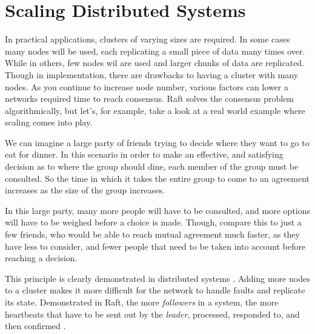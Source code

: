 \section{Scaling Distributed Systems}

In practical applications, clusters of varying sizes are required. In some cases many nodes will be used, each replicating a small piece of data many times over. While in others, few nodes wil are used and larger chunks of data are replicated. Though in implementation, there are drawbacks to having a cluster with many nodes. As you continue to increase node number, various factors can lower a networks required time to reach consensus. Raft solves the consensus problem algorithmically, but let's, for example, take a look at a real world example where scaling comes into play.

We can imagine a large party of friends trying to decide where they want to go to eat for dinner. In this scenario in order to make an effective, and satisfying decision as to where the group should dine, each member of the group must be consulted. So the time in which it takes the entire group to come to an agreement increases as the size of the group increases.

In this large party, many more people will have to be consulted, and more options will have to be weighed before a choice is made. Though, compare this to just a few friends, who would be able to reach mutual agreement much faster, as they have less to consider, and fewer people that need to be taken into account before reaching a decision.

This principle is clearly demonstrated in distributed systems \cite{NeumanScaling}. Adding more nodes to a cluster makes it more difficult for the network to handle faults and replicate its state. Demonstrated in Raft, the more \textit{followers} in a system, the more heartbeats that have to be sent out by the \textit{leader}, processed, responded to, and then confirmed \cite{OngaroRaft}.